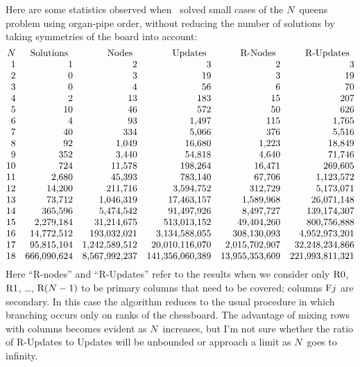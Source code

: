 Here are some statistics observed when \algoDLX\ solved small cases of
the $N$~queens problem using organ-pipe order, without reducing the
number of solutions by taking symmetries of the board into account:
$$\vbox{\halign{\hfil#\quad&\hfil#\quad&\hfil#\quad&\hfil#\quad&\hfil#\quad&\hfil#\cr
$N$&Solutions\enspace&Nodes\enspace&Updates\enspace
&R-Nodes\enspace&R-Updates\enspace\cr
1&           1&             2&               3&              2&               3\cr
2&           0&             3&              19&              3&              19\cr
3&           0&             4&              56&              6&              70\cr
4&           2&            13&             183&             15&             207\cr
5&          10&            46&             572&             50&             626\cr
6&           4&            93&           1{,}497&            115&           1{,}765\cr
7&          40&           334&           5{,}066&            376&           5{,}516\cr
8&          92&         1{,}049&          16{,}680&          1{,}223&          18{,}849\cr
9&         352&         3{,}440&          54{,}818&          4{,}640&          71{,}746\cr
10&         724&        11{,}578&         198{,}264&         16{,}471&         269{,}605\cr
11&       2{,}680&        45{,}393&         783{,}140&         67{,}706&       1{,}123{,}572\cr
12&      14{,}200&       211{,}716&       3{,}594{,}752&        312{,}729&       5{,}173{,}071\cr
13&      73{,}712&     1{,}046{,}319&      17{,}463{,}157&      1{,}589{,}968&      26{,}071{,}148\cr
14&     365{,}596&     5{,}474{,}542&      91{,}497{,}926&      8{,}497{,}727&     139{,}174{,}307\cr
15&   2{,}279{,}184&    31{,}214{,}675&     513{,}013{,}152&     49{,}404{,}260&     800{,}756{,}888\cr
16&  14{,}772{,}512&   193{,}032{,}021&   3{,}134{,}588{,}055&    308{,}130{,}093&   4{,}952{,}973{,}201\cr
17&  95{,}815{,}104& 1{,}242{,}589{,}512&  20{,}010{,}116{,}070&  2{,}015{,}702{,}907&  32{,}248{,}234{,}866\cr 
18& 666{,}090{,}624& 8{,}567{,}992{,}237& 141{,}356{,}060{,}389& 13{,}955{,}353{,}609& 221{,}993{,}811{,}321\cr}}$$
Here ``R-nodes'' and ``R-Updates'' refer to the results
when we consider only ${\rm R}0$, ${\rm R}1$, \dots, ${\rm R}(N-1)$ to be
primary columns that need to be covered; columns ${\rm F}j$ are
secondary. In this case the algorithm
reduces to the usual procedure in which branching occurs only on ranks
of the chessboard.  The advantage of mixing rows with columns becomes
evident as $N$~increases, but I'm not sure whether the ratio of
R-Updates to Updates will be unbounded or approach a
limit as $N$~goes to infinity.

